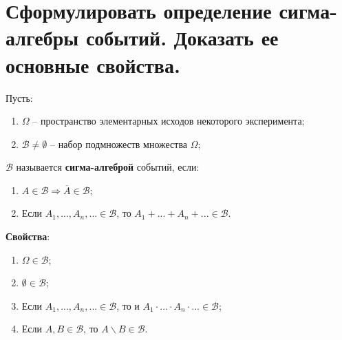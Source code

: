 \section{Сформулировать определение сигма-алгебры событий. Доказать ее основные свойства.}

Пусть:
\begin{enumerate}
	\item $\Omega$ -- пространство элементарных исходов некоторого эксперимента;
	\item $\mathcal{B} \neq \emptyset$ -- набор подмножеств множества $\Omega$;
\end{enumerate}

$\mathcal{B}$ называется \textbf{сигма-алгеброй} событий, если:
\begin{enumerate}
	\item $A \in \mathcal{B} \Rightarrow \overline{A} \in \mathcal{B}$;
	\item Если $A_1, ..., A_n, ... \in \mathcal{B}$, то $A_1 + ... + A_n + ... \in \mathcal{B}$.
\end{enumerate}

\textbf{Свойства}:
\begin{enumerate}
	\item $\Omega \in \mathcal{B}$;
	\item $\emptyset \in \mathcal{B}$;
	\item Если $A_1, ..., A_n, ... \in \mathcal{B}$, то и $A_1 \cdot ... \cdot A_n \cdot ... \in \mathcal{B}$;
	\item Если $A, B \in \mathcal{B}$, то $A \backslash B \in \mathcal{B}$.
\end{enumerate}


